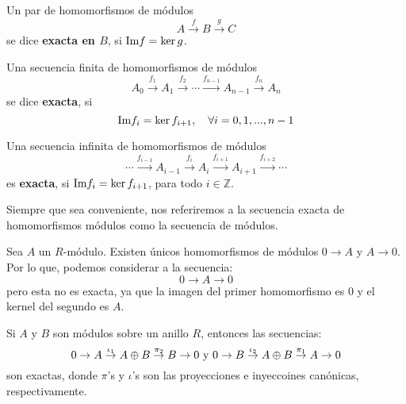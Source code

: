 \documentclass[12pt]{report}
\newcounter{it}
\theoremstyle{largebreak}
\newcommand{\im}{\ensuremath{\textup{Im}}}
\begin{document}
    \begin{mydef}
        Un par de homomorfismos de módulos
        \begin{equation*}
            A\overset{f}{\rightarrow}B\overset{g}{\rightarrow}C
        \end{equation*}
        se dice \textbf{exacta en $B$}, si $\im f=\ker g$.

        Una secuencia finita de homomorfismos de módulos
        \begin{equation*}
            A_0\overset{f_1}{\rightarrow}A_1\overset{f_2}{\rightarrow}\cdots\overset{f_{ n-1}}{\rightarrow}A_{ n-1}\overset{f_n}{\rightarrow}A_n
        \end{equation*}
        se dice \textbf{exacta}, si
        \begin{equation*}
            \im f_i=\ker f_{ i+1},\quad\forall i=0,1,...,n-1
        \end{equation*}
        
        Una secuencia infinita de homomorfismos de módulos
        \begin{equation*}
            \cdots\overset{f_{ i-1}}{\rightarrow}A_{ i-1}\overset{f_i}{\rightarrow}A_i\overset{f_{ i+1}}{\rightarrow}A_{ i+1}\overset{f_{ i+2}}{\rightarrow}\cdots
        \end{equation*}
        es \textbf{exacta}, si $\im f_i=\ker f_{ i+1}$, para todo $i\in\mathbb{Z}$.
    \end{mydef}

    Siempre que sea conveniente, nos referiremos a la secuencia exacta de homomorfismos módulos como la secuencia de módulos.

    \begin{exa}
        Sea $A$ un $R$-módulo. Existen únicos homomorfismos de módulos $0\rightarrow A$ y $A\rightarrow 0$. Por lo que, podemos considerar a la secuencia:
        \begin{equation*}
            0\rightarrow A\rightarrow 0
        \end{equation*}
        pero esta no es exacta, ya que la imagen del primer homomorfismo es 0 y el kernel del segundo es $A$.
    \end{exa}

    \begin{exa}
        Si $A$ y $B$ son módulos sobre un anillo $R$, entonces las secuencias:
        \begin{equation*}
            0\rightarrow A\overset{\iota_1}{\rightarrow}A\oplus B\overset{\pi_2}{\rightarrow}B\rightarrow 0\textup{ y }0\rightarrow B\overset{\iota_2}{\rightarrow}A\oplus B\overset{\pi_1}{\rightarrow}A\rightarrow 0
        \end{equation*} 
        son exactas, donde $\pi$'s y $\iota$'s son las proyecciones e inyeccoines canónicas, respectivamente.
    \end{exa}
\end{document}
